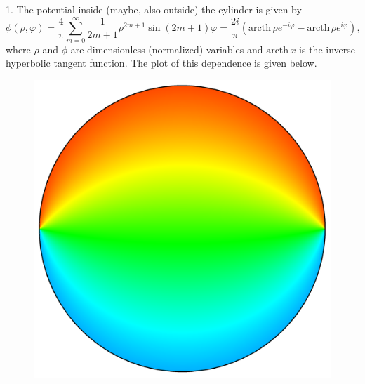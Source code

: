 \documentclass[12pt,a4paper,pdflatex]{disser}
\begin{document}
1. The potential inside (maybe, also outside) the cylinder is given by
$$
  \phi(\rho,\varphi)=\frac{4}{\pi}\sum\limits_{m=0}^{\infty} \frac{1}{2m+1}\rho^{2m+1}\sin(2m+1)\varphi=\frac{2i}{\pi}\left(\text{arcth}\,\rho e^{-i\varphi}-\text{arcth}\,\rho e^{i\varphi}\right),
$$
where $\rho$ and $\phi$ are dimensionless (normalized) variables and $\text{arcth}\,x$ is the inverse hyperbolic tangent function. The plot of this dependence is given below.
\begin{figure}[!h]
\begin{center}
\includegraphics[scale=0.75]{potential.pdf}

\end{center}
\end{figure}
\end{document}
